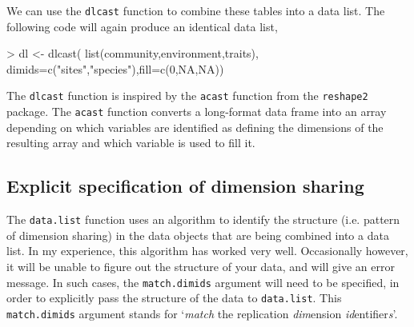 \documentclass{article}
\newcommand{\code}[1]{\texttt{#1}}
\numberwithin{exercise}{section}
\begin{document}
We can use the \code{dlcast} function to combine these tables into a data list.  The following code will again produce an identical data list,
\begin{Schunk}
\begin{Sinput}
> dl <- dlcast(
   list(community,environment,traits),
   dimids=c("sites","species"),fill=c(0,NA,NA))
\end{Sinput}
\end{Schunk}
The \code{dlcast} function is inspired by the \code{acast} function from the \code{reshape2} package.  The \code{acast} function converts a long-format data frame into an array depending on which variables are identified as defining the dimensions of the resulting array and which variable is used to fill it.  

\subsection{Explicit specification of dimension sharing}

The \code{data.list} function uses an algorithm to identify the structure (i.e. pattern of dimension sharing) in the data objects that are being combined into a data list.  In my experience, this algorithm has worked very well.  Occasionally however, it will be unable to figure out the structure of your data, and will give an error message.  In such cases, the \code{match.dimids} argument will need to be specified, in order to explicitly pass the structure of the data to \code{data.list}.  This \code{match.dimids} argument stands for `\emph{match} the replication \emph{dim}ension \emph{id}entifier\emph{s}'.
\end{document}

